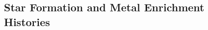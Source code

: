 \documentclass[twocolumn,trackchanges]{aastex701}
\begin{document}







\subsection{Star Formation and Metal Enrichment Histories\label{subsec:SFH&Metal}}
 

\end{document}
